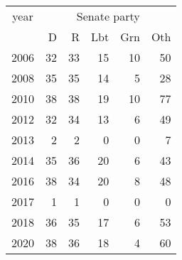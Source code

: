 \footnotesize\begin{tabular}[t]{lrrrrr}
\toprule
\multicolumn{1}{c}{year} & \multicolumn{5}{c}{Senate party} \\
\cmidrule(l{3pt}r{3pt}){1-1} \cmidrule(l{3pt}r{3pt}){2-6}
  & D & R & Lbt & Grn & Oth\\
\midrule
2006 & 32 & 33 & 15 & 10 & 50\\
2008 & 35 & 35 & 14 & 5 & 28\\
2010 & 38 & 38 & 19 & 10 & 77\\
2012 & 32 & 34 & 13 & 6 & 49\\
2013 & 2 & 2 & 0 & 0 & 7\\
2014 & 35 & 36 & 20 & 6 & 43\\
2016 & 38 & 34 & 20 & 8 & 48\\
2017 & 1 & 1 & 0 & 0 & 0\\
2018 & 36 & 35 & 17 & 6 & 53\\
2020 & 38 & 36 & 18 & 4 & 60\\
\bottomrule
\end{tabular}
